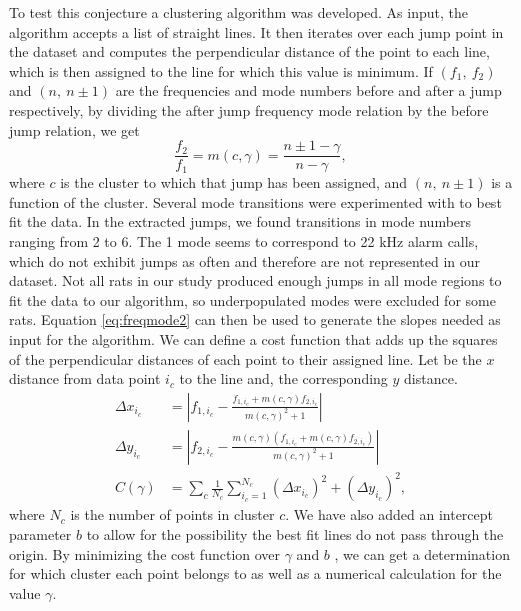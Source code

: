 \documentclass[twocolumn, prl]{revtex4}
\begin{document}
To test this conjecture a clustering algorithm was developed. As input, the algorithm accepts a list of straight lines. It then iterates over each jump point in the dataset and computes the perpendicular distance of the point to each line, which is then assigned to the line for which this value is minimum. If $\left(f_{1},\: f_{2}\right)$ and $\left(n,\: n\pm1\right)$ are the frequencies and mode numbers before and after a jump respectively, by dividing the after jump frequency mode relation by the before jump relation, we get \begin{equation}
\frac{f_{2}}{f_{1}}=m(c,\gamma)=\frac{n\pm1-\gamma}{n-\gamma},\label{eq:freqmode2}
\end{equation}
where $c$ is the cluster to which that jump has been assigned, and $\left(n,\: n\pm1\right)$ is a function of the cluster. Several mode transitions were experimented with to best fit the data. In the extracted jumps, we found transitions in mode numbers ranging from 2 to 6. The 1 mode seems to correspond to 22 kHz alarm calls, which do not exhibit jumps as often and therefore are not represented in our dataset. Not all rats in our study produced enough jumps in all mode regions to fit the data to our algorithm, so underpopulated modes were excluded for some rats. Equation \ref{eq:freqmode2} can then be used to generate the slopes needed as input for the algorithm. We can define a cost function that adds up the squares of the perpendicular distances of each point to their assigned line. Let be the $x$ distance from data point $i_c$ to the line and, the corresponding $y$ distance. 
\begin{equation}
\label{eq:cost}
\begin{align*}
\Delta x_{i_{c}}&=\left\vert f_{1,i_{c}}-\frac{f_{1,i_{c}}+m\left(c,\gamma\right)f_{2,i_{c}}}{m\left(c,\gamma\right)^{2}+1}\right\vert \\
\Delta y_{i_c}&=\left\vert f_{2,i_{c}}-\frac{m\left(c,\gamma\right)\left(f_{1,i_{c}}+m\left(c,\gamma\right)f_{2,i_{c}}\right)}{m\left(c,\gamma\right)^{2}+1}  \right\vert\\
C\left(\gamma\right)&=\sum_{c}\frac{1}{N_{c}}\sum_{i_c=1}^{N_{c}}\left(\Delta x_{i_c}\right)^{2}+\left(\Delta y_{i_c}\right)^{2},
\end{align*}
\end{equation}
where $N_{c}$ is the number of points in cluster $c$. We have also added an intercept parameter $b$ to allow for the possibility the best fit lines do not pass through the origin. By minimizing the cost function over $\gamma$ and $b$ , we can get a determination for which cluster each point belongs to as well as a numerical calculation for the value $\gamma$.
\end{document}
